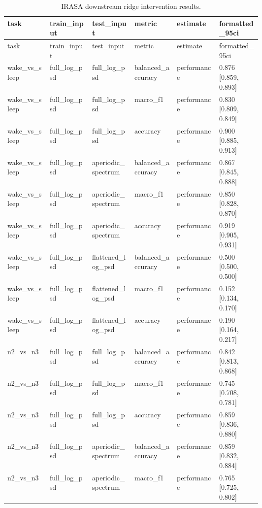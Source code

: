 \begin{longtable}{p{0.10\linewidth}p{0.10\linewidth}p{0.10\linewidth}p{0.10\linewidth}p{0.10\linewidth}p{0.10\linewidth}}
\caption{IRASA downstream ridge intervention results.}\label{tab:supp_irasa_ridge}\\
\toprule
task & train\_input & test\_input & metric & estimate & formatted\_95ci\\
\midrule
\endfirsthead
\toprule
task & train\_input & test\_input & metric & estimate & formatted\_95ci\\
\midrule
\endhead
wake\_vs\_sleep & full\_log\_psd & full\_log\_psd & balanced\_accuracy & performance & 0.876 [0.859, 0.893]\\
wake\_vs\_sleep & full\_log\_psd & full\_log\_psd & macro\_f1 & performance & 0.830 [0.809, 0.849]\\
wake\_vs\_sleep & full\_log\_psd & full\_log\_psd & accuracy & performance & 0.900 [0.885, 0.913]\\
wake\_vs\_sleep & full\_log\_psd & aperiodic\_spectrum & balanced\_accuracy & performance & 0.867 [0.845, 0.888]\\
wake\_vs\_sleep & full\_log\_psd & aperiodic\_spectrum & macro\_f1 & performance & 0.850 [0.828, 0.870]\\
wake\_vs\_sleep & full\_log\_psd & aperiodic\_spectrum & accuracy & performance & 0.919 [0.905, 0.931]\\
wake\_vs\_sleep & full\_log\_psd & flattened\_log\_psd & balanced\_accuracy & performance & 0.500 [0.500, 0.500]\\
wake\_vs\_sleep & full\_log\_psd & flattened\_log\_psd & macro\_f1 & performance & 0.152 [0.134, 0.170]\\
wake\_vs\_sleep & full\_log\_psd & flattened\_log\_psd & accuracy & performance & 0.190 [0.164, 0.217]\\
n2\_vs\_n3 & full\_log\_psd & full\_log\_psd & balanced\_accuracy & performance & 0.842 [0.813, 0.868]\\
n2\_vs\_n3 & full\_log\_psd & full\_log\_psd & macro\_f1 & performance & 0.745 [0.708, 0.781]\\
n2\_vs\_n3 & full\_log\_psd & full\_log\_psd & accuracy & performance & 0.859 [0.836, 0.880]\\
n2\_vs\_n3 & full\_log\_psd & aperiodic\_spectrum & balanced\_accuracy & performance & 0.859 [0.832, 0.884]\\
n2\_vs\_n3 & full\_log\_psd & aperiodic\_spectrum & macro\_f1 & performance & 0.765 [0.725, 0.802]\\

\end{longtable}
